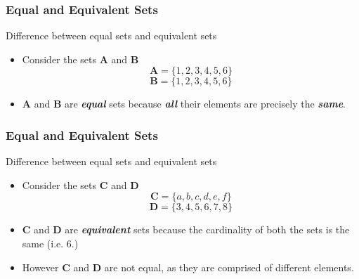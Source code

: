 \documentclass{beamer}
\begin{document}
\begin{frame}
\frametitle{Equal and Equivalent Sets}
\Large

Difference between equal sets and equivalent sets

\begin{itemize}
\item Consider the sets \textbf{A} and \textbf{B}
\[ \boldsymbol{A} = \{ 1,2,3,4,5,6 \} \] 
\[ \boldsymbol{B} = \{1,2,3,4,5,6 \} \]
\vspace{0.2cm}
\item \textbf{A} and \textbf{B} are \textit{\textbf{equal}} sets because \textit{\textbf{all}} their
elements are precisely the \textit{\textbf{same}}.
\end{itemize}


\end{frame}

\begin{frame}
\frametitle{Equal and Equivalent Sets}
\Large
\vspace{-0.7cm}
Difference between equal sets and equivalent sets

\begin{itemize}
\item Consider the sets \textbf{C} and \textbf{D}
\[ \boldsymbol{C} = \{a,b,c,d,e,f\} \]  \[ \boldsymbol{D} = \{3,4,5,6,7,8\} \]
\vspace{0.2cm}
\item \textbf{C} and \textbf{D} are \textit{\textbf{equivalent}} sets
because the cardinality of both the sets is the same (i.e. 6.)
\item However \textbf{C} and \textbf{D} are not equal, as they are comprised of different elements.
\end{itemize}





\end{frame}
\end{document}
